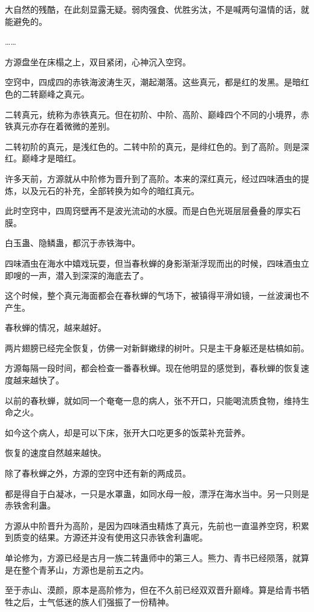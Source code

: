 \begin{this_body}
大自然的残酷，在此刻显露无疑。弱肉强食、优胜劣汰，不是喊两句温情的话，就能避免的。

……

方源盘坐在床榻之上，双目紧闭，心神沉入空窍。

空窍中，四成四的赤铁海波涛生灭，潮起潮落。这些真元，都是红的发黑。是暗红色的二转巅峰之真元。

二转真元，统称为赤铁真元。但在初阶、中阶、高阶、巅峰四个不同的小境界，赤铁真元亦存在着微微的差别。

二转初阶的真元，是浅红色的。二转中阶的真元，是绯红色的。到了高阶。则是深红。巅峰才是暗红。

许多天前，方源就从中阶修为晋升到了高阶。本来的深红真元，经过四味酒虫的提炼，以及元石的补充，全部转换为如今的暗红真元。

此时空窍中，四周窍壁再不是波光流动的水膜。而是白色光斑层层叠叠的厚实石膜。

白玉蛊、隐鳞蛊，都沉于赤铁海中。

四味酒虫在海水中嬉戏玩耍，但当春秋蝉的身影渐渐浮现而出的时候，四味酒虫立即嗖的一声，潜入到深深的海底去了。

这个时候，整个真元海面都会在春秋蝉的气场下，被镇得平滑如镜，一丝波澜也不产生。

春秋蝉的情况，越来越好。

两片翅膀已经完全恢复，仿佛一对新鲜嫩绿的树叶。只是主干身躯还是枯槁如前。

方源每隔一段时间，都会检查一番春秋蝉。现在他明显的感觉到，春秋蝉的恢复速度越来越快了。

以前的春秋蝉，就如同一个奄奄一息的病人，张不开口，只能喝流质食物，维持生命之火。

如今这个病人，却是可以下床，张开大口吃更多的饭菜补充营养。

恢复的速度自然越来越快。

除了春秋蝉之外，方源的空窍中还有新的两成员。

都是得自于白凝冰，一只是水罩蛊，如同水母一般，漂浮在海水当中。另一只则是赤铁舍利蛊。

方源从中阶晋升为高阶，是因为四味酒虫精炼了真元，先前也一直温养空窍，积累到质变的结果。方源还并没有使用这只赤铁舍利蛊呢。

单论修为，方源已经是古月一族二转蛊师中的第三人。熊力、青书已经陨落，就算是在整个青茅山，方源也是前五之内。

至于赤山、漠颜，原本是高阶修为，但在不久前已经双双晋升巅峰。算是给青书牺牲之后，士气低迷的族人们强振了一份精神。


\end{this_body}
